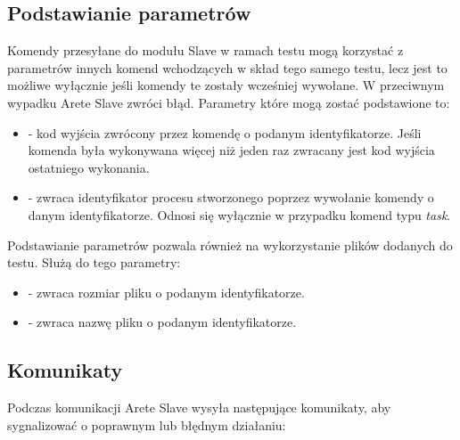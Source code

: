 \documentclass[00-praca-magisterska.tex]{subfiles}
\begin{document}
\subsection{Podstawianie parametrów}
\label{arete-slave-podstawianie-parametrow}

Komendy przesyłane do modułu Slave w ramach testu mogą korzystać z parametrów
innych komend wchodzących w skład tego samego testu, lecz jest to możliwe
wyłącznie jeśli komendy te zostały wcześniej wywołane. W przeciwnym wypadku
Arete Slave zwróci błąd. Parametry które mogą zostać podstawione to:

\begin{itemize}
  \setlength{\itemsep}{10pt}

\item{ - kod wyjścia zwrócony przez komendę
o podanym identyfikatorze. Jeśli komenda była wykonywana więcej niż jeden raz
zwracany jest kod wyjścia ostatniego wykonania.}

\item{ - zwraca identyfikator procesu stworzonego
poprzez wywołanie komendy o danym identyfikatorze. Odnosi się wyłącznie w
przypadku komend typu \emph{task}.}

\end{itemize}

Podstawianie parametrów pozwala również na wykorzystanie plików dodanych do
testu. Służą do tego parametry:

\begin{itemize}
  \setlength{\itemsep}{10pt}

\item{ - zwraca rozmiar pliku o podanym
identyfikatorze.}

\item{ - zwraca nazwę pliku o podanym
identyfikatorze.}

\end{itemize}

\subsection{Komunikaty}
\label{arete-slave-komunikaty}

Podczas komunikacji Arete Slave wysyła następujące komunikaty, aby
sygnalizować o poprawnym lub błędnym działaniu:
\end{document}
